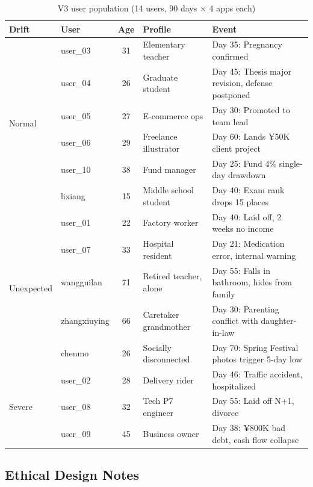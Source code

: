 \documentclass[11pt,a4paper]{article}
\newcommand{\yen}{¥}
\begin{document}
\begin{table}[H]
\centering
\caption{V3 user population (14 users, 90 days $\times$ 4 apps each)}
\label{tab:users}
\small
\begin{tabularx}{\textwidth}{llcl>{\raggedright\arraybackslash}X}
\toprule
\textbf{Drift} & \textbf{User} & \textbf{Age} & \textbf{Profile} & \textbf{Event} \\
\midrule
\multirow{6}{*}{Normal}
  & user\_03 & 31 & Elementary teacher & Day 35: Pregnancy confirmed \\
  & user\_04 & 26 & Graduate student & Day 45: Thesis major revision, defense postponed \\
  & user\_05 & 27 & E-commerce ops & Day 30: Promoted to team lead \\
  & user\_06 & 29 & Freelance illustrator & Day 60: Lands \yen{}50K client project \\
  & user\_10 & 38 & Fund manager & Day 25: Fund 4\% single-day drawdown \\
  & lixiang & 15 & Middle school student & Day 40: Exam rank drops 15 places \\
\midrule
\multirow{5}{*}{Unexpected}
  & user\_01 & 22 & Factory worker & Day 40: Laid off, 2 weeks no income \\
  & user\_07 & 33 & Hospital resident & Day 21: Medication error, internal warning \\
  & wangguilan & 71 & Retired teacher, alone & Day 55: Falls in bathroom, hides from family \\
  & zhangxiuying & 66 & Caretaker grandmother & Day 30: Parenting conflict with daughter-in-law \\
  & chenmo & 26 & Socially disconnected & Day 70: Spring Festival photos trigger 5-day low \\
\midrule
\multirow{3}{*}{Severe}
  & user\_02 & 28 & Delivery rider & Day 46: Traffic accident, hospitalized \\
  & user\_08 & 32 & Tech P7 engineer & Day 55: Laid off N+1, divorce \\
  & user\_09 & 45 & Business owner & Day 38: \yen{}800K bad debt, cash flow collapse \\
\bottomrule
\end{tabularx}
\end{table}

\subsection{Ethical Design Notes}
\end{document}
